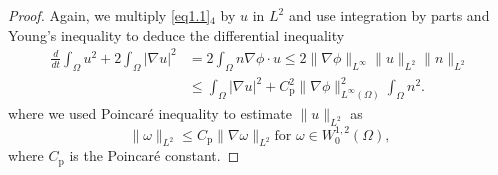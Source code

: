 \documentclass[10pt,a4paper]{amsart}
\numberwithin{equation}{section}
\begin{document}
\begin{proof}
Again, we multiply \eqref{eq1.1}$_4$ by $u$ in $L^2$ and use integration by parts 
and Young's inequality to deduce the differential inequality
\begin{equation}\label{eq-3.23}
\begin{aligned}
\frac{d}{dt} \int_{\Omega} u^2 + 2\int_{\Omega} |\nabla u|^2
&= 2\int_{\Omega} n \nabla \phi \cdot u\leq 2\|\nabla\phi\|_{L^\infty}\|u\|_{L^2}\|n\|_{L^2}
\\
& \leq \int_\Omega |\nabla u|^2 + C_{\mathrm{p}}^2\|\nabla\phi\|^2_{L^{\infty}(\Omega)}
\int_\Omega n^2. 
\end{aligned}
\end{equation}
where we used Poincar\'e inequality to estimate $\|u\|_{L^2}$ as
$$
\|\omega\|_{L^2}\leq C_{\mathrm{p}}\|\nabla \omega\|_{L^2}\text{for } 
\omega\in W^{1,2}_0(\Omega),
$$
where $C_{\mathrm{p}}$ is the Poincar\'e constant.


\end{proof}
\end{document}
